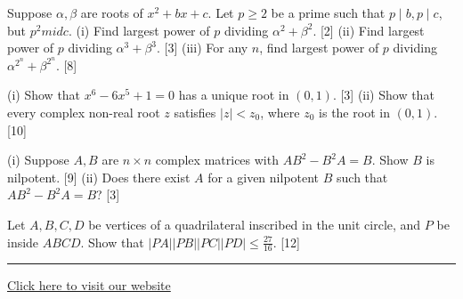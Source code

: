 \documentclass[11pt,a4paper]{article}
\begin{document}
\begin{parts}
  \item Suppose $\alpha, \beta$ are roots of $x^2 + bx + c$. Let $p \ge 2$ be a prime such that $p \mid b, p \mid c$, but $p^2 
mid c$.
  (i) Find largest power of $p$ dividing $\alpha^2 + \beta^2$. [2]
  (ii) Find largest power of $p$ dividing $\alpha^3 + \beta^3$. [3]
  (iii) For any $n$, find largest power of $p$ dividing $\alpha^{2^n} + \beta^{2^n}$. [8]

  \item (i) Show that $x^6 - 6x^5 + 1 = 0$ has a unique root in $(0, 1)$. [3]
  (ii) Show that every complex non-real root $z$ satisfies $|z| < z_0$, where $z_0$ is the root in $(0, 1)$. [10]

  \item (i) Suppose $A, B$ are $n  \times n$ complex matrices with $AB^2 - B^2A = B$. Show $B$ is nilpotent. [9]
  (ii) Does there exist $A$ for a given nilpotent $B$ such that $AB^2 - B^2A = B$? [3]

  \item Let $A, B, C, D$ be vertices of a quadrilateral inscribed in the unit circle, and $P$ be inside $ABCD$. Show that $|PA||PB||PC||PD| \le \frac{27}{16}$. [12]
\end{parts}

\vfill\rule{\linewidth}{0.4pt}

\begin{center}\small\href{https://bhu-exam.vercel.app/}{Click here to visit our website}\end{center}
\end{document}
